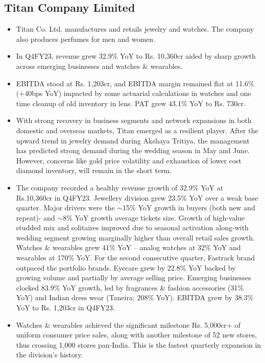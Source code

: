 \subsection{Titan Company Limited}

\begin{itemize}
  \item Titan Co. Ltd. manufactures and retails jewelry and watches. The company also produces perfumes for men and women.
  \item In Q4FY23, revenue grew 32.9\% YoY to Rs. 10,360cr aided by sharp growth across emerging businesses and watches \& wearables.
  \item EBITDA stood at Rs. 1,203cr, and EBITDA margin remained flat at 11.6\% (+40bps YoY) impacted by some actuarial calculations in watches and one time cleanup of old inventory in lens. PAT grew 43.1\% YoY to Rs. 730cr.
  \item With strong recovery in business segments and network expansions in both domestic and overseas markets, Titan emerged as a resilient player. After the upward trend in jewelry demand during Akshaya Tritiya, the management has predicted strong demand during the wedding season in May and June. However, concerns like gold price volatility and exhaustion of lower cost diamond inventory, will remain in the short term.
  \item The company recorded a healthy revenue growth of 32.9\% YoY at Rs.10,360cr in Q4FY23. Jewellery division grew 23.5\% YoY over a weak base quarter. Major drivers were the $\sim$15\% YoY growth in buyers (both new and repeat)- and $\sim$8\% YoY growth average tickets size. Growth of high-value studded mix and solitaires improved due to seasonal activation along-with wedding segment growing marginally higher than overall retail sales growth. Watches \& wearables grew 41\% YoY – analog watches at 32\% YoY and wearables at 170\% YoY. For the second consecutive quarter, Fastrack brand outpaced the portfolio brands. Eyecare grew by 22.8\% YoY backed by growing volume and partially by average selling price. Emerging businesses clocked 83.9\% YoY growth, led by fragrances \& fashion accessories (31\% YoY) and Indian dress wear (Taneira; 208\% YoY). EBITDA grew by 38.3\% YoY to Rs. 1,203cr in Q4FY23.
  \item Watches \& wearables achieved the significant milestone Rs. 5,000cr+ of uniform consumer price sales, along with another milestone of 52 new stores, thus crossing 1,000 stores pan-India. This is the fastest quarterly expansion in the division's history.

\end{itemize}
